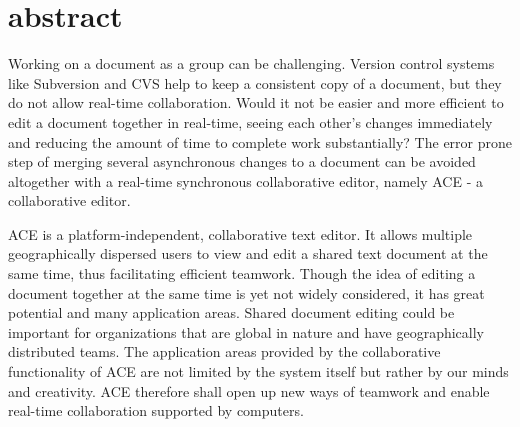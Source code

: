 \chapter*{abstract}

Working on a document as a group can be challenging. Version control systems like Subversion and CVS help to keep a consistent copy of a document, but they do not allow real-time collaboration. Would it not be easier and more efficient to edit a document together in real-time, seeing each other's changes immediately and reducing the amount of time to complete work substantially? The error prone step of merging several asynchronous changes to a document can be avoided altogether with a real-time synchronous collaborative editor, namely ACE - a collaborative editor.

ACE is a platform-independent, collaborative text editor. It allows multiple geographically dispersed users to view and edit a shared text document at the same time, thus facilitating efficient teamwork. Though the idea of editing a document together at the same time is yet not widely considered, it has great potential and many application areas. Shared document editing could be important for organizations that are global in nature and have geographically distributed  teams. The application areas provided by the collaborative functionality of ACE are not limited by the system itself but rather by our minds and creativity. ACE therefore shall open up new ways of teamwork and enable real-time collaboration supported by computers.
